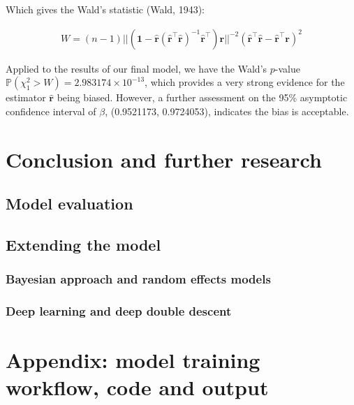 \documentclass[
]{article}
\begin{document}
Which gives the Wald's statistic (Wald, 1943):

\begin{align*}
  W = (n - 1) ||(\mathbf{1} - \mathbf{\hat{r}}(\mathbf{\hat{r}}^\top\mathbf{\hat{r}})^{-1}\mathbf{\hat{r}}^\top)\mathbf{r}||^{-2}(\mathbf{\hat{r}}^\top\mathbf{\hat{r}} - \mathbf{\hat{r}}^\top\mathbf{r})^2
\end{align*}

Applied to the results of our final model, we have the Wald's
\(p\)-value \(\mathbb{P}(\chi_1^2 > W) = 2.983174 \times 10^{-13}\),
which provides a very strong evidence for the estimator
\(\mathbf{\hat{r}}\) being biased. However, a further assessment on the
95\% asymptotic confidence interval of \(\beta\), (0.9521173,
0.9724053), indicates the bias is acceptable.

\newpage

\hypertarget{conclusion-and-further-research}{%
\section{Conclusion and further
research}\label{conclusion-and-further-research}}

\hypertarget{model-evaluation}{%
\subsection{Model evaluation}\label{model-evaluation}}

\hypertarget{extending-the-model}{%
\subsection{Extending the model}\label{extending-the-model}}

\hypertarget{bayesian-approach-and-random-effects-models}{%
\subsubsection{Bayesian approach and random effects
models}\label{bayesian-approach-and-random-effects-models}}

\hypertarget{deep-learning-and-deep-double-descent}{%
\subsubsection{Deep learning and deep double
descent}\label{deep-learning-and-deep-double-descent}}

\newpage

\hypertarget{appendix-model-training-workflow-code-and-output}{%
\section{Appendix: model training workflow, code and
output}\label{appendix-model-training-workflow-code-and-output}}
\end{document}
